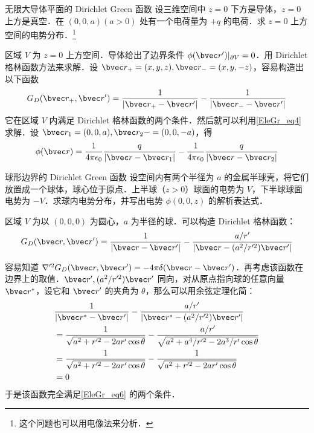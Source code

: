 \begin{example}{无限大导体平面的 Dirichlet Green 函数}
设三维空间中 $z=0$ 下方是导体，$z=0$ 上方是真空．在 $(0,0,a)(a>0)$ 处有一个电荷量为 $+q$ 的电荷．求 $z=0$ 上方空间的电势分布．\footnote{这个问题也可以用电像法来分析．}

区域 $V$ 为 $z=0$ 上方空间．导体给出了边界条件 $\phi(\bvec r')|_{\partial V}=0$．用 Dirichlet 格林函数方法来求解．设 $\bvec r_+=(x,y,z),\bvec r_-=(x,y,-z)$，容易构造出以下函数
\begin{equation}
G_D(\bvec r_+,\bvec r')=\frac{1}{|\bvec r_+-\bvec r'|}-\frac{1}{|\bvec r_--\bvec r'|}
\end{equation}
它在区域 $V$ 内满足 Dirichlet 格林函数的两个条件．然后就可以利用\autoref{EleGr_eq4} 求解．设 $\bvec r_1=(0,0,a),\bvec r_2-=(0,0,-a)$，得
\begin{equation}
\phi(\bvec r)=\frac{1}{4\pi \epsilon_0}\frac{q}{|\bvec r-\bvec r_1|}-\frac{1}{4\pi \epsilon_0}\frac{q}{|\bvec r-\bvec r_2|}
\end{equation}

\end{example}
\begin{example}{球形边界的 Dirichlet Green 函数}
设空间内有两个半径为 $a$ 的金属半球壳，将它们放置成一个球体，球心位于原点．上半球（$z>0$）球面的电势为 $V$，下半球球面电势为 $-V$．求球内电势分布，并写出电势 $\phi(0,0,z)$ 的解析表达式．

区域 $V$ 为以 $(0,0,0)$ 为圆心，$a$ 为半径的球．可以构造 Dirichlet 格林函数：
\begin{equation}
G_D(\bvec r,\bvec r')=\frac{1}{|\bvec r-\bvec r'|}-\frac{a/r'}{|\bvec r-(a^2/r'^2)\bvec r'|}
\end{equation}

容易知道 $\nabla'^2G_D(\bvec r,\bvec r')=-4\pi\delta(\bvec r-\bvec r')$．再考虑该函数在边界上的取值．$\bvec r',(a^2/r'^2)\bvec r'$ 同向，对从原点指向球的任意向量 $\bvec r^*$，设它和 $\bvec r'$ 的夹角为 $\theta$，那么可以用余弦定理化简：
\begin{equation}
\begin{aligned}
&\frac{1}{|\bvec r^*-\bvec r'|}-\frac{a/r'}{|\bvec r^*-(a^2/r'^2)\bvec r'|}
\\&=\frac{1}{\sqrt{a^2+r'^2-2ar'\cos\theta}}-\frac{a/r'}{\sqrt{a^2+a^4/r'^2-2a^3/r'\cos\theta}}
\\&=\frac{1}{\sqrt{a^2+r'^2-2ar'\cos\theta}}-\frac{1}{\sqrt{a^2+r'^2-2ar'\cos\theta}}
\\&=0
\end{aligned}
\end{equation}
于是该函数完全满足\autoref{EleGr_eq6} 的两个条件．


\end{example}

